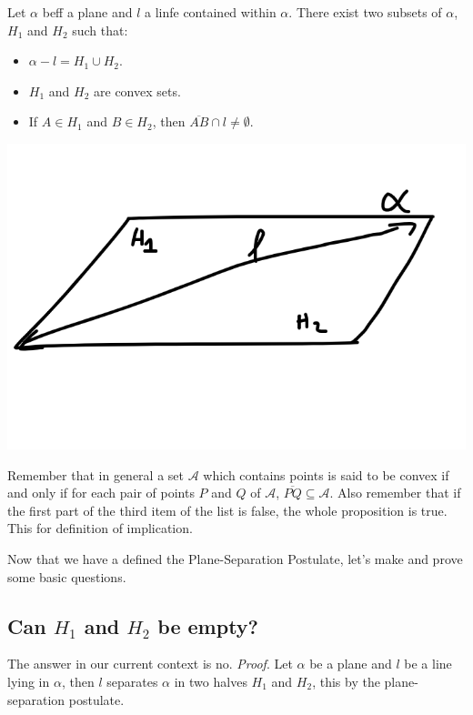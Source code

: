 \documentclass[11pt]{article}
\begin{document}
    Let $\alpha$ beff a plane and $l$ a linfe contained within $\alpha$. There exist two subsets of $\alpha$, $H_1$ and $H_2$ such that:
    \begin{itemize}
        \item $\alpha - l = H_1 \cup H_2$.
        \item $H_1$ and $H_2$ are convex sets.
        \item If $A \in H_1$ and $B \in H_2$, then $\overline{AB} \cap l \not = \emptyset$.
    \end{itemize}
    \begin{center}
        \includegraphics[scale=0.2]{image1.png}
    \end{center}
    Remember that in general a set $\mathcal{A}$ which contains points is said to be convex if and only if for each pair of points $P$ and $Q$ of $\mathcal{A}$, $\overline{PQ} \subseteq \mathcal{A}$.
    Also remember that if the first part of the third item of the list is false, the whole proposition is true. This for definition of implication.

    Now that we have a defined the Plane-Separation Postulate, let's make and prove some basic questions.

    \subsection{Can $H_1$ and $H_2$ be empty?}
        The answer in our current context is no. \textit{Proof}. Let $\alpha$ be a plane and $l$ be a line lying in $\alpha$, then $l$ separates $\alpha$ in two halves $H_1$ and $H_2$, this by the plane-separation postulate.\\
\end{document}
